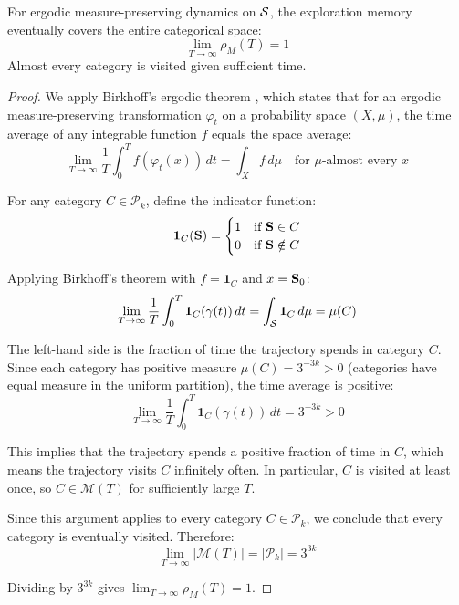 \begin{theorem}
\label{thm:asymptotic_exhaustion}
For ergodic measure-preserving dynamics on $\mathcal{S}$, the exploration memory eventually covers the entire categorical space:
\begin{equation}
\lim_{T \to \infty} \rho_M(T) = 1
\label{eq:asymptotic_exhaustion}
\end{equation}
Almost every category is visited given sufficient time.
\end{theorem}

\begin{proof}
We apply Birkhoff's ergodic theorem \citep{birkhoff1931proof}, which states that for an ergodic measure-preserving transformation $\varphi_t$ on a probability space $(X, \mu)$, the time average of any integrable function $f$ equals the space average:
\begin{equation}
\lim_{T \to \infty} \frac{1}{T} \int_0^T f(\varphi_t(x)) \, dt = \int_X f \, d\mu \quad \text{for } \mu\text{-almost every } x
\end{equation}

For any category $C \in \mathcal{P}_k$, define the indicator function:
\begin{equation}
\mathbf{1}_C(\mathbf{S}) = \begin{cases}
1 & \text{if } \mathbf{S} \in C \\
0 & \text{if } \mathbf{S} \notin C
\end{cases}
\end{equation}

Applying Birkhoff's theorem with $f = \mathbf{1}_C$ and $x = \mathbf{S}_0$:
\begin{equation}
\lim_{T \to \infty} \frac{1}{T} \int_0^T \mathbf{1}_C(\gamma(t)) \, dt = \int_{\mathcal{S}} \mathbf{1}_C \, d\mu = \mu(C)
\end{equation}

The left-hand side is the fraction of time the trajectory spends in category $C$. Since each category has positive measure $\mu(C) = 3^{-3k} > 0$ (categories have equal measure in the uniform partition), the time average is positive:
\begin{equation}
\lim_{T \to \infty} \frac{1}{T} \int_0^T \mathbf{1}_C(\gamma(t)) \, dt = 3^{-3k} > 0
\end{equation}

This implies that the trajectory spends a positive fraction of time in $C$, which means the trajectory visits $C$ infinitely often. In particular, $C$ is visited at least once, so $C \in \mathcal{M}(T)$ for sufficiently large $T$.

Since this argument applies to every category $C \in \mathcal{P}_k$, we conclude that every category is eventually visited. Therefore:
\begin{equation}
\lim_{T \to \infty} |\mathcal{M}(T)| = |\mathcal{P}_k| = 3^{3k}
\end{equation}

Dividing by $3^{3k}$ gives $\lim_{T \to \infty} \rho_M(T) = 1$.
\end{proof}

